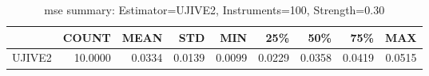 \begin{table}[ht]
\centering
\caption{mse summary: Estimator=UJIVE2, Instruments=100, Strength=0.30}
\begin{tabular}{lrrrrrrrr}
\toprule
 & COUNT & MEAN & STD & MIN & 25\% & 50\% & 75\% & MAX \\
\midrule
UJIVE2 & 10.0000 & 0.0334 & 0.0139 & 0.0099 & 0.0229 & 0.0358 & 0.0419 & 0.0515 \\
\bottomrule
\end{tabular}
\end{table}
